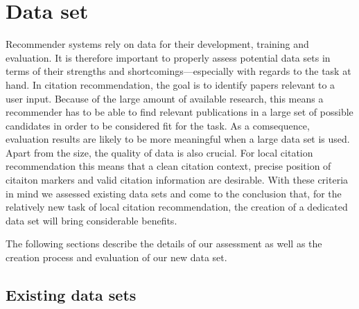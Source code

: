 \chapter{Data set}\label{chap:dataset}
Recommender systems rely on data for their development, training and evaluation. It is therefore important to properly assess potential data sets in terms of their strengths and shortcomings---especially with regards to the task at hand. In citation recommendation, the goal is to identify papers relevant to a user input. Because of the large amount of available research, this means a recommender has to be able to find relevant publications in a large set of possible candidates in order to be considered fit for the task. As a comsequence, evaluation results are likely to be more meaningful when a large data set is used. Apart from the size, the quality of data is also crucial. For local citation recommendation this means that a clean citation context, precise position of citaiton markers and valid citation information are desirable. With these criteria in mind we assessed existing data sets and come to the conclusion that, for the relatively new task of local citation recommendation, the creation of a dedicated data set will bring considerable benefits.

The following sections describe the details of our assessment as well as the creation process and evaluation of our new data set.

\section{Existing data sets}

